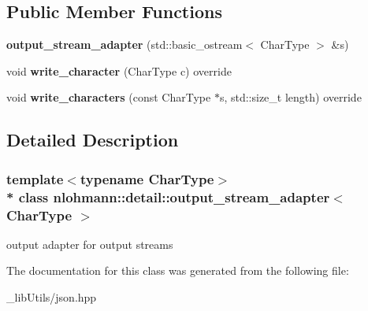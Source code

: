 \subsection*{Public Member Functions}
\begin{DoxyCompactItemize}
\item 
{\bfseries output\+\_\+stream\+\_\+adapter} (std\+::basic\+\_\+ostream$<$ Char\+Type $>$ \&s)\hypertarget{classnlohmann_1_1detail_1_1output__stream__adapter_a4e78a9bd19cbf3a4191adc62d14f0055}{}\label{classnlohmann_1_1detail_1_1output__stream__adapter_a4e78a9bd19cbf3a4191adc62d14f0055}

\item 
void {\bfseries write\+\_\+character} (Char\+Type c) override\hypertarget{classnlohmann_1_1detail_1_1output__stream__adapter_a6e2698c76b200b2d8fac6cebfc43a245}{}\label{classnlohmann_1_1detail_1_1output__stream__adapter_a6e2698c76b200b2d8fac6cebfc43a245}

\item 
void {\bfseries write\+\_\+characters} (const Char\+Type $\ast$s, std\+::size\+\_\+t length) override\hypertarget{classnlohmann_1_1detail_1_1output__stream__adapter_ad61375497a7d03cb0bdcddfdaad185d0}{}\label{classnlohmann_1_1detail_1_1output__stream__adapter_ad61375497a7d03cb0bdcddfdaad185d0}

\end{DoxyCompactItemize}


\subsection{Detailed Description}
\subsubsection*{template$<$typename Char\+Type$>$\\*
class nlohmann\+::detail\+::output\+\_\+stream\+\_\+adapter$<$ Char\+Type $>$}

output adapter for output streams 

The documentation for this class was generated from the following file\+:\begin{DoxyCompactItemize}
\item 
\+\_\+lib\+Utils/json.\+hpp\end{DoxyCompactItemize}
